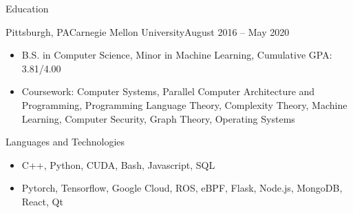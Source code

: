 \documentclass[termes]{resume}
\begin{document}
	\makeheader
	
	\begin{cvsection}{Education}
		\begin{cvsubsection}{Pittsburgh, PA}{Carnegie Mellon University}{August 2016 -- May 2020}
			\begin{itemize}
				\item B.S. in Computer Science, Minor in Machine Learning, Cumulative GPA: 3.81/4.00
				\item Coursework: Computer Systems, Parallel Computer Architecture and Programming, Programming Language Theory, Complexity Theory, Machine Learning, Computer Security, Graph Theory, Operating Systems
			\end{itemize}
		\end{cvsubsection}
	\end{cvsection}
		
	\begin{cvsection}{Languages and Technologies}
		\begin{cvsubsection}{}{}{}	
			\begin{itemize}
				\item C++, Python, CUDA, Bash, Javascript, SQL
				\item Pytorch, Tensorflow, Google Cloud, ROS, eBPF, Flask, Node.js, MongoDB, React, Qt
			\end{itemize}
		\end{cvsubsection}
	\end{cvsection}
	
\end{document}
